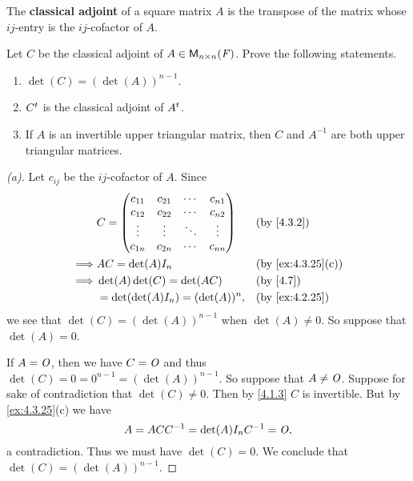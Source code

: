 \begin{defn}\label{4.3.2}
  The \textbf{classical adjoint} of a square matrix \(A\) is the transpose of the matrix whose \(i j\)-entry is the \(i j\)-cofactor of \(A\).
\end{defn}

\setcounter{ex}{26}
\begin{ex}\label{ex:4.3.27}
  Let \(C\) be the classical adjoint of \(A \in \mathsf{M}_{{n} \times n}({\mathit{F}})\).
  Prove the following statements.
  \begin{enumerate}
    \item \(\det(C) = (\det(A))^{n - 1}\).
    \item \({C}^{t}\) is the classical adjoint of \({A}^{t}\).
    \item If \(A\) is an invertible upper triangular matrix, then \(C\) and \(A^{-1}\) are both upper triangular matrices.
  \end{enumerate}
\end{ex}

\begin{proof}[(a)]
  Let \(c_{i j}\) be the \(i j\)-cofactor of \(A\).
  Since
  \begin{align*}
             & C = \begin{pmatrix}
                     c_{1 1} & c_{2 1} & \cdots & c_{n 1} \\
                     c_{1 2} & c_{2 2} & \cdots & c_{n 2} \\
                     \vdots  & \vdots  & \ddots & \vdots  \\
                     c_{1 n} & c_{2 n} & \cdots & c_{n n}
                   \end{pmatrix} &  & \text{(by \cref{4.3.2})}                              \\
    \implies & AC = \det(A) I_n                        &  & \text{(by \cref{ex:4.3.25}(c))} \\
    \implies & \det(A) \det(C) = \det(AC)              &  & \text{(by \cref{4.7})}          \\
             & = \det(\det(A) I_n) = (\det(A))^n,      &  & \text{(by \cref{ex:4.2.25})}
  \end{align*}
  we see that \(\det(C) = (\det(A))^{n - 1}\) when \(\det(A) \neq 0\).
  So suppose that \(\det(A) = 0\).

  If \(A = \mathit{O}\), then we have \(C = \mathit{O}\) and thus \(\det(C) = 0 = 0^{n - 1} = (\det(A))^{n - 1}\).
  So suppose that \(A \neq \mathit{O}\).
  Suppose for sake of contradiction that \(\det(C) \neq 0\).
  Then by \cref{4.1.3} \(C\) is invertible.
  But by \cref{ex:4.3.25}(c) we have
  \[
    A = A C C^{-1} = \det(A) I_n C^{-1} = \mathit{O},
  \]
  a contradiction.
  Thus we must have \(\det(C) = 0\).
  We conclude that \(\det(C) = (\det(A))^{n - 1}\).
\end{proof}

